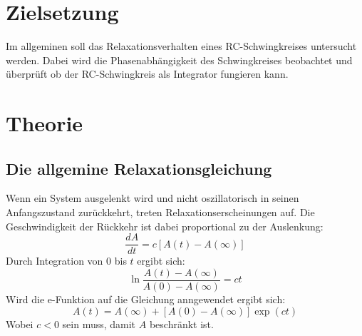 \section{Zielsetzung}
Im allgeminen soll das Relaxationsverhalten eines RC-Schwingkreises untersucht werden.
Dabei wird die Phasenabhängigkeit des Schwingkreises beobachtet und überprüft ob der RC-Schwingkreis als Integrator fungieren kann.

\section{Theorie}
\label{sec:Theorie}
\subsection{Die allgemine Relaxationsgleichung}
Wenn ein System ausgelenkt wird und nicht oszillatorisch in seinen Anfangszustand zurückkehrt, treten Relaxationserscheinungen auf.
Die Geschwindigkeit der Rückkehr ist dabei proportional zu der Auslenkung:
\begin{equation}
  \frac{dA}{dt}=c[A(t)-A(\infty)]
\end{equation}
Durch Integration von $0$ bis $t$ ergibt sich:
\begin{equation}
  \ln{\frac{A(t)-A(\infty)}{A(0)-A(\infty)}}=ct
\end{equation}
Wird die e-Funktion auf die Gleichung anngewendet ergibt sich:
\begin{equation}
  \label{eq:gl2}
  A(t)=A(\infty)+[A(0)-A(\infty)]\exp(ct)
\end{equation}
Wobei $c<0$ sein muss, damit $A$ beschränkt ist.
